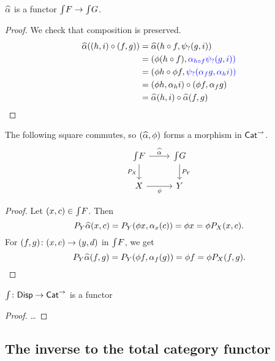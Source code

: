 \begin{lem}
    $\widehat \alpha$ is a functor $\textstyle{\int} F \to \textstyle{\int} G$.
\end{lem}
\begin{proof}
    We check that composition is preserved.
    \begin{align*}
        \widehat \alpha((h,i) \circ (f,g))
        &= \widehat \alpha(h \circ f, \psi_? (g,i))
        \\&= (\phi (h \circ f), \textcolor{blue}{\alpha_{h \circ f} \psi_? (g,i))}
        \\&= (\phi h \circ \phi f, \textcolor{blue}{ \psi_?(\alpha_f g, \alpha_h i))}
        \\&= (\phi h, \alpha_h i) \circ (\phi f, \alpha_f g)
        \\&= \widehat \alpha(h,i) \circ \widehat \alpha(f,g) \qedhere
    \end{align*}
\end{proof}

\begin{lem}
    The following square commutes, so $(\widehat \alpha, \phi)$ forms a morphism in $\mathsf{Cat}^\to$.
    \[
    \begin{tikzcd}
        \Int F
        \arrow[d, "P_X", swap]
        \arrow[r, "\alphahat"]
        &
        \Int G
        \arrow[d, "P_Y"]
        \\
        X 
        \arrow[r, swap, "\phi"]
        &
        Y
    \end{tikzcd}
    \]
\end{lem}
\begin{proof}
    Let $(x,c) \in \textstyle{\int} F$. Then 
    \[
        P_Y \widehat \alpha (x,c) = P_Y(\phi x, \alpha_x(c)) = \phi x = \phi P_X(x,c).
    \]
    For $(f,g) \colon (x,c) \to (y,d)$ in $\textstyle{\int} F$, we get
    \[
        P_Y \widehat \alpha (f,g) = P_Y(\phi f, \alpha_f(g)) = \phi f = \phi P_X(f,g). \qedhere
    \]
\end{proof}

\begin{prop}
\label{thm:intfunctor}
    $\textstyle{\int} \colon \mathsf{Disp} \to \mathsf{Cat}^\to$ is a functor
\end{prop}
\begin{proof}
    \dots
\end{proof}

\subsection*{The inverse to the total category functor}

